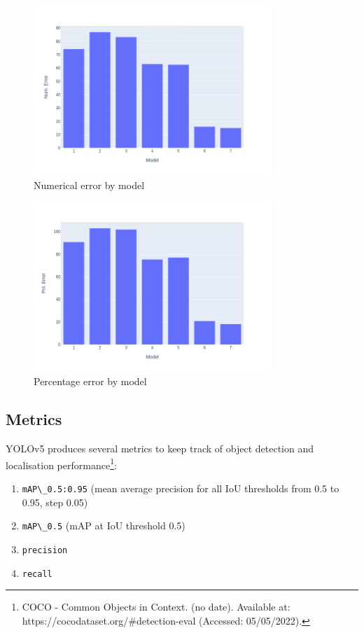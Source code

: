 \begin{figure}[h!]
	\centering
	\includegraphics[width=0.8\textwidth]{images/05Testing/num_error.png}
	\caption{Numerical error by model}
	\label{num_error}
\end{figure}

\begin{figure}[h!]
	\centering
	\includegraphics[width=0.8\textwidth]{images/05Testing/pct_error.png}
	\caption{Percentage error by model}
	\label{pct_error}
\end{figure}

\subsection{Metrics}
YOLOv5 produces several metrics to keep track of object detection and localisation performance\footnote{COCO - Common Objects in Context. (no date). Available at: https://cocodataset.org/#detection-eval (Accessed: 05/05/2022).}:\\

\begin{enumerate}
    \item \verb`mAP\_0.5:0.95` (mean average precision for all IoU thresholds from 0.5 to 0.95, step 0.05)
    \item \verb`mAP\_0.5` (mAP at IoU threshold 0.5)
    \item \verb`precision`
    \item \verb`recall`
\end{enumerate}

